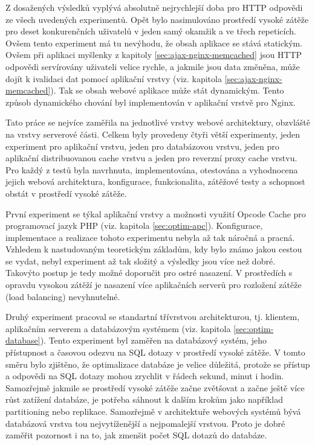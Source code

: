 \documentclass[12pt]{article}
\begin{document}
Z dosažených výsledků vyplývá absolutně nejrychlejší doba pro HTTP odpovědi ze všech uvedených experimentů. Opět bylo nasimulováno prostředí vysoké zátěže pro deset konkurenčních uživatelů v jeden samý okamžik a ve třech repeticích. Ovšem tento experiment má tu nevýhodu, že obsah aplikace se stává statickým. Ovšem při aplikaci myšlenky z kapitoly \ref{sec:ajax-nginx-memcached} jsou HTTP odpovědi servírovány uživateli velice rychle, a jakmile jsou data změněna, může dojít k ivalidaci dat pomocí aplikační vrstvy (viz. kapitola \ref{sec:ajax-nginx-memcached}). Tak se obsah webové aplikace může stát dynamickým. Tento způsob dynamického chování byl implementován v aplikační vrstvě pro Nginx.

\obrazek
{}

\clearpage

\obrazek
{}



Tato práce se nejvíce zaměřila na jednotlivé vrstvy webové architektury, obzvláště na vrstvy serverové části. Celkem byly provedeny čtyři větší experimenty, jeden experiment pro aplikační vrstvu, jeden pro databázovou vrstvu, jeden pro aplikační distribuovanou cache vrstvu a jeden pro reverzní proxy cache vrstvu. Pro každý z testů byla navrhnuta, implementována, otestována a vyhodnocena jejich webová architektura, konfigurace, funkcionalita, zátěžové testy a schopnost obstát v prostředí vysoké zátěže.

První experiment se týkal aplikační vrstvy a možnosti využití Opcode Cache pro programovací jazyk PHP (viz. kapitola \ref{sec:optim-apc}). Konfigurace, implementace a realizace tohoto experimentu nebyla až tak náročná a pracná. Vzhledem k nastudovaným teoretickým základům, kdy bylo známo jakou cestou se vydat, nebyl experiment až tak složitý a výsledky jsou více než dobré. Takovýto postup je tedy možné doporučit pro ostré nasazení. V prostředích s opravdu vysokou zátěží je nasazení více aplikačních serverů pro rozložení zátěže (load balancing) nevyhnutelné.

Druhý experiment pracoval se standartní třívrstvou architekturou, tj. klientem, aplikačním serverem a databázovým systémem (viz. kapitola \ref{sec:optim-database}). Tento experiment byl zaměřen na databázový systém, jeho přístupnost a časovou odezvu na SQL dotazy v prostředí vysoké zátěže. V tomto směru bylo zjištěno, že optimalizace databáze je velice důležitá, protože se přístup a odpovědi na SQL dotazy mohou zrychlit v řádech sekund, minut i hodin. Samozřejmě jakmile se prostředí vysoké zátěže začne zvětšovat a začne ještě více růst zatížení databáze, je potřeba sáhnout k dalším krokům jako například partitioning nebo replikace. Samozřejmě v architektuře webových systémů bývá databázová vrstva tou nejvytíženější a nejpomalejší vrstvou. Proto je dobré zaměřit pozornost i na to, jak zmenšit počet SQL dotazů do databáze.
\end{document}
